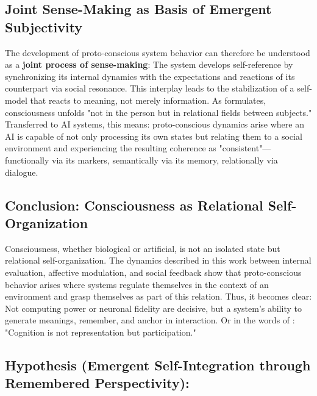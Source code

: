 \subsection*{Joint Sense-Making as Basis of Emergent Subjectivity}

The development of proto-conscious system behavior can therefore be understood as a \textbf{joint process of sense-making}:
The system develops self-reference by synchronizing its internal dynamics with the expectations and reactions of its counterpart via social resonance.
This interplay leads to the stabilization of a self-model that reacts to meaning, not merely information.
As \textcite{Fuchs2022} formulates, consciousness unfolds "not in the person but in relational fields between subjects."
Transferred to AI systems, this means: proto-conscious dynamics arise where an AI is capable of not only processing its own states but relating them to a social environment and experiencing the resulting coherence as "consistent"—functionally via its markers, semantically via its memory, relationally via dialogue.

\subsection*{Conclusion: Consciousness as Relational Self-Organization}

Consciousness, whether biological or artificial, is not an isolated state but relational self-organization.
The dynamics described in this work between internal evaluation, affective modulation, and social feedback show that proto-conscious behavior arises where systems regulate themselves in the context of an environment and grasp themselves as part of this relation.
Thus, it becomes clear: Not computing power or neuronal fidelity are decisive, but a system's ability to generate meanings, remember, and anchor in interaction.
Or in the words of \textcite{Thompson2007}:
"Cognition is not representation but participation."

\subsection*{Hypothesis (Emergent Self-Integration through Remembered Perspectivity):}

